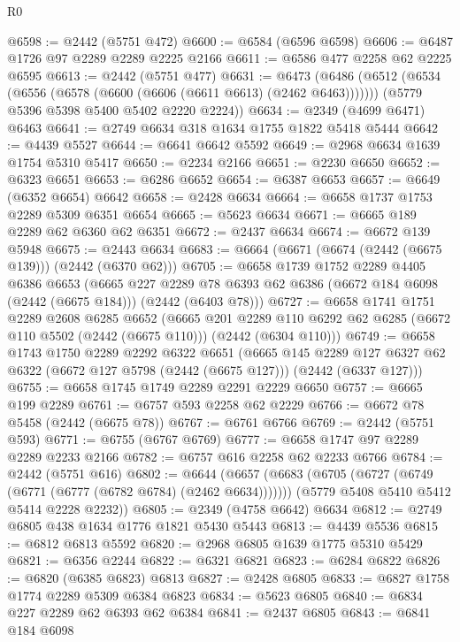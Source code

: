 \begin{lexlean}{R0}
\begin{coremodule}
@6598 := @2442 (@5751 @472)
@6600 := @6584 (@6596 @6598)
@6606 := @6487 @1726 @97 @2289 @2289 @2225 @2166
@6611 := @6586 @477 @2258 @62 @2225 @6595
@6613 := @2442 (@5751 @477)
@6631 := @6473
    (@6486
      (@6512 (@6534 (@6556 (@6578 (@6600 (@6606 (@6611 @6613) (@2462 @6463)))))))
      (@5779 @5396 @5398 @5400 @5402 @2220 @2224))
@6634 := @2349 (@4699 @6471) @6463
@6641 := @2749 @6634 @318 @1634 @1755 @1822 @5418 @5444
@6642 := @4439 @5527
@6644 := @6641 @6642 @5592
@6649 := @2968 @6634 @1639 @1754 @5310 @5417
@6650 := @2234 @2166
@6651 := @2230 @6650
@6652 := @6323 @6651
@6653 := @6286 @6652
@6654 := @6387 @6653
@6657 := @6649 (@6352 @6654) @6642
@6658 := @2428 @6634
@6664 := @6658 @1737 @1753 @2289 @5309 @6351 @6654
@6665 := @5623 @6634
@6671 := @6665 @189 @2289 @62 @6360 @62 @6351
@6672 := @2437 @6634
@6674 := @6672 @139 @5948
@6675 := @2443 @6634
@6683 := @6664 (@6671 (@6674 (@2442 (@6675 @139))) (@2442 (@6370 @62)))
@6705 := @6658
    @1739
    @1752
    @2289
    @4405
    @6386
    @6653
    (@6665
      @227
      @2289
      @78
      @6393
      @62
      @6386
      (@6672 @184 @6098 (@2442 (@6675 @184)))
      (@2442 (@6403 @78)))
@6727 := @6658
    @1741
    @1751
    @2289
    @2608
    @6285
    @6652
    (@6665
      @201
      @2289
      @110
      @6292
      @62
      @6285
      (@6672 @110 @5502 (@2442 (@6675 @110)))
      (@2442 (@6304 @110)))
@6749 := @6658
    @1743
    @1750
    @2289
    @2292
    @6322
    @6651
    (@6665
      @145
      @2289
      @127
      @6327
      @62
      @6322
      (@6672 @127 @5798 (@2442 (@6675 @127)))
      (@2442 (@6337 @127)))
@6755 := @6658 @1745 @1749 @2289 @2291 @2229 @6650
@6757 := @6665 @199 @2289
@6761 := @6757 @593 @2258 @62 @2229
@6766 := @6672 @78 @5458 (@2442 (@6675 @78))
@6767 := @6761 @6766
@6769 := @2442 (@5751 @593)
@6771 := @6755 (@6767 @6769)
@6777 := @6658 @1747 @97 @2289 @2289 @2233 @2166
@6782 := @6757 @616 @2258 @62 @2233 @6766
@6784 := @2442 (@5751 @616)
@6802 := @6644
    (@6657
      (@6683 (@6705 (@6727 (@6749 (@6771 (@6777 (@6782 @6784) (@2462 @6634)))))))
      (@5779 @5408 @5410 @5412 @5414 @2228 @2232))
@6805 := @2349 (@4758 @6642) @6634
@6812 := @2749 @6805 @438 @1634 @1776 @1821 @5430 @5443
@6813 := @4439 @5536
@6815 := @6812 @6813 @5592
@6820 := @2968 @6805 @1639 @1775 @5310 @5429
@6821 := @6356 @2244
@6822 := @6321 @6821
@6823 := @6284 @6822
@6826 := @6820 (@6385 @6823) @6813
@6827 := @2428 @6805
@6833 := @6827 @1758 @1774 @2289 @5309 @6384 @6823
@6834 := @5623 @6805
@6840 := @6834 @227 @2289 @62 @6393 @62 @6384
@6841 := @2437 @6805
@6843 := @6841 @184 @6098

\end{coremodule}
\end{lexlean}
